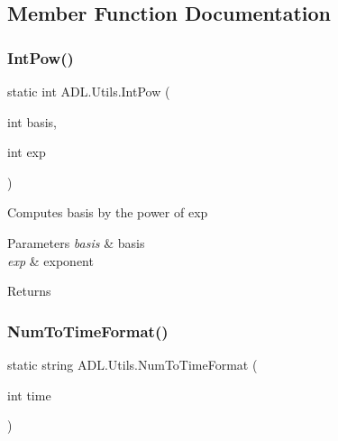 \subsection{Member Function Documentation}
\mbox{\label{class_a_d_l_1_1_utils_ac921cfeea8d73d9ac4298802e2594504}} 
\subsubsection{\texorpdfstring{Int\+Pow()}{IntPow()}}
{\footnotesize\ttfamily static int A\+D\+L.\+Utils.\+Int\+Pow (\begin{DoxyParamCaption}\item[{int}]{basis,  }\item[{int}]{exp }\end{DoxyParamCaption})\hspace{0.3cm}{\ttfamily [static]}}



Computes basis by the power of exp 


\begin{DoxyParams}{Parameters}
{\em basis} & basis\\
\hline
{\em exp} & exponent\\
\hline
\end{DoxyParams}
\begin{DoxyReturn}{Returns}

\end{DoxyReturn}
\mbox{\label{class_a_d_l_1_1_utils_a7f8a756ce7c6c8d4cfe7126ef534e151}} 
\subsubsection{\texorpdfstring{Num\+To\+Time\+Format()}{NumToTimeFormat()}}
{\footnotesize\ttfamily static string A\+D\+L.\+Utils.\+Num\+To\+Time\+Format (\begin{DoxyParamCaption}\item[{int}]{time }\end{DoxyParamCaption})\hspace{0.3cm}{\ttfamily [static]}}



